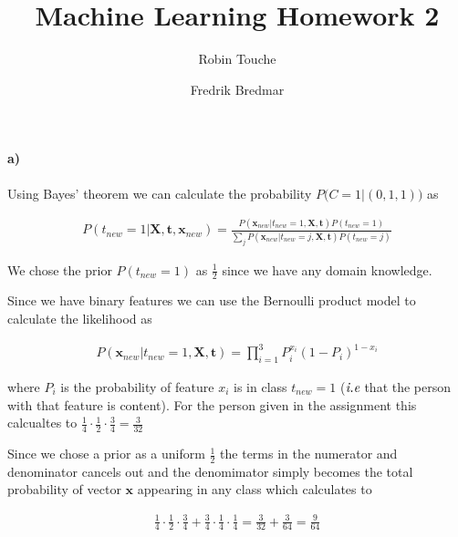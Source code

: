 \documentclass{article}
\author{
  Robin Touche \\
  \and
  Fredrik Bredmar
}
\title{Machine Learning Homework 2}
\begin{document}
\maketitle

\setcounter{section}{1}
\subsection{}
\paragraph{a)}

Using Bayes' theorem we can calculate the probability $P\big(C = 1 \vert (0, 1, 1)\big)$ as

\begin{align}
  P\left( t_{new} = 1 \vert \mathbf{X}, \mathbf{t}, \mathbf{x}_{new} \right)
  = \frac{P \left( \mathbf{x}_{new} \vert t_{new} = 1, \mathbf{X}, \mathbf{t} \right) P \left( t_{new} = 1 \right)}{ \sum_j P \left( \mathbf{x}_{new} \vert t_{new} = j, \mathbf{X}, \mathbf{t} \right) P \left( t_{new} = j \right) }
\end{align}

We chose the prior $P ( t_{new} = 1 )$ as $\frac{1}{2}$ since we have any
domain knowledge.

Since we have binary features we can use the Bernoulli product model to
calculate the likelihood as

\begin{align}
  P \left( \mathbf{x}_{new} \vert t_{new} = 1, \mathbf{X}, \mathbf{t} \right) = \prod_{i = 1}^{3} P_i^{x_i} \left( 1 - P_i \right)^{1 - x_i}
\end{align}

where $P_i$ is the probability of feature $x_i$ is in class $t_{new} = 1$
($\emph{i.e}$ that the person with that feature is content).  For the person
given in the assignment this calcualtes to $\frac{1}{4} \cdot \frac{1}{2} \cdot
\frac{3}{4} = \frac{3}{32}$

Since we chose a prior as a uniform $\frac{1}{2}$ the terms in the numerator
and denominator cancels out and the denomimator simply becomes the total
probability of vector $\mathbf{x}$ appearing in any class which calculates to

\begin{align}
  \frac{1}{4} \cdot \frac{1}{2} \cdot \frac{3}{4} + \frac{3}{4} \cdot \frac{1}{4} \cdot \frac{1}{4}  = \frac{3}{32} + \frac{3}{64} = \frac{9}{64}
\end{align}
\end{document}
